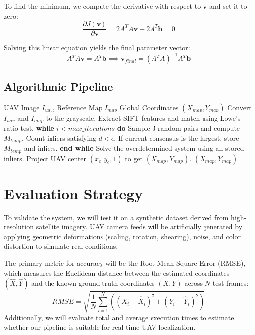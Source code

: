 \documentclass[conference]{IEEEtran}
\begin{document}
To find the minimum, we compute the derivative with respect to $\mathbf{v}$ and set it to zero:
\begin{equation}
\frac{\partial J(\mathbf{v})}{\partial \mathbf{v}} = 2A^T A \mathbf{v} - 2A^T \mathbf{b} = 0
\end{equation}

Solving this linear equation yields the final parameter vector:
\begin{equation}
A^T A \mathbf{v} = A^T \mathbf{b} \implies \mathbf{v}_{final} = (A^T A)^{-1} A^T \mathbf{b}
\end{equation}

\subsection{Algorithmic Pipeline}

\begin{algorithm}[H]
\caption{UAV Localization Pipeline}
\begin{algorithmic}[1]
\REQUIRE UAV Image $I_{uav}$, Reference Map $I_{map}$
\ENSURE Global Coordinates $(X_{map}, Y_{map})$
\STATE Convert $I_{uav}$ and $I_{map}$ to the grayscale.
\STATE Extract SIFT features and match using Lowe's ratio test.
\STATE \textbf{while} $i < max\_iterations$ \textbf{do}
\STATE \quad Sample 3 random pairs and compute $M_{temp}$.
\STATE \quad Count inliers satisfying $d < \epsilon$.
\STATE \quad If current consensus is the largest, store $M_{temp}$ and inliers.
\STATE \textbf{end while}
\STATE Solve the overdetermined system using all stored inliers.
\STATE Project UAV center $(x_c, y_c, 1)$ to get $(X_{map}, Y_{map})$.
\RETURN $(X_{map}, Y_{map})$
\end{algorithmic}
\end{algorithm}

\section{Evaluation Strategy}
To validate the system, we will test it on a synthetic dataset derived from high-resolution satellite imagery. UAV camera feeds will be artificially generated by applying geometric deformations (scaling, rotation, shearing), noise, and color distortion to simulate real conditions.

The primary metric for accuracy will be the Root Mean Square Error (RMSE), which measures the Euclidean distance between the estimated coordinates $(\hat{X}, \hat{Y})$ and the known ground-truth coordinates $(X, Y)$ across $N$ test frames:
\begin{equation}
RMSE = \sqrt{\frac{1}{N} \sum_{i=1}^{N} \left( (X_{i} - \hat{X}_{i})^2 + (Y_{i} - \hat{Y}_{i})^2 \right)}
\end{equation}
Additionally, we will evaluate total and average execution times to estimate whether our pipeline is suitable for real-time UAV localization.
\end{document}
